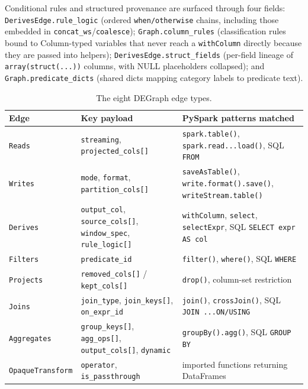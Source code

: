 \documentclass[11pt]{article}
\newcommand{\code}[1]{\texttt{#1}}
\begin{document}
Conditional rules and structured provenance are surfaced through four fields:
\code{DerivesEdge.\allowbreak rule_logic} (ordered \code{when/\allowbreak otherwise} chains, including those
embedded in \code{concat_ws}/\code{coalesce}); \code{Graph.\allowbreak column_rules}
(classification rules bound to Column-typed variables that never reach a
\code{withColumn} directly because they are passed into helpers);
\code{DerivesEdge.\allowbreak struct_fields} (per-field lineage of \code{array(struct(.\allowbreak .\allowbreak .\allowbreak ))}
columns, with NULL placeholders collapsed); and \code{Graph.\allowbreak predicate_dicts}
(shared dicts mapping category labels to predicate text).

\begin{table}[t]
\centering
\caption{The eight DEGraph edge types.}
\label{tab:edges}
\footnotesize
\begin{tabular}{@{}L{2.4cm}L{5.9cm}L{6.7cm}@{}}
\toprule
Edge & Key payload & PySpark patterns matched \\
\midrule
\code{Reads} & \code{streaming}, \code{projected_cols[]} & \code{spark.table()}, \code{spark.\allowbreak read.\allowbreak .\allowbreak .\allowbreak load()}, SQL \code{FROM} \\
\code{Writes} & \code{mode}, \code{format}, \code{partition_cols[]} & \code{saveAsTable()}, \code{write.\allowbreak format().\allowbreak save()}, \code{writeStream.\allowbreak table()} \\
\code{Derives} & \code{output_col}, \code{source_cols[]}, \code{window_spec}, \code{rule_logic[]} & \code{withColumn}, \code{select}, \code{selectExpr}, SQL \code{SELECT expr AS col} \\
\code{Filters} & \code{predicate_id} & \code{filter()}, \code{where()}, SQL \code{WHERE} \\
\code{Projects} & \code{removed_cols[]} / \code{kept_cols[]} & \code{drop()}, column-set restriction \\
\code{Joins} & \code{join_type}, \code{join_keys[]}, \code{on_expr_id} & \code{join()}, \code{crossJoin()}, SQL \code{JOIN .\allowbreak .\allowbreak .\allowbreak  ON/\allowbreak USING} \\
\code{Aggregates} & \code{group_keys[]}, \code{agg_ops[]}, \code{output_cols[]}, \code{dynamic} & \code{groupBy().\allowbreak agg()}, SQL \code{GROUP BY} \\
\code{OpaqueTransform} & \code{operator}, \code{is_passthrough} & imported functions returning DataFrames \\
\bottomrule
\end{tabular}
\end{table}
\end{document}
